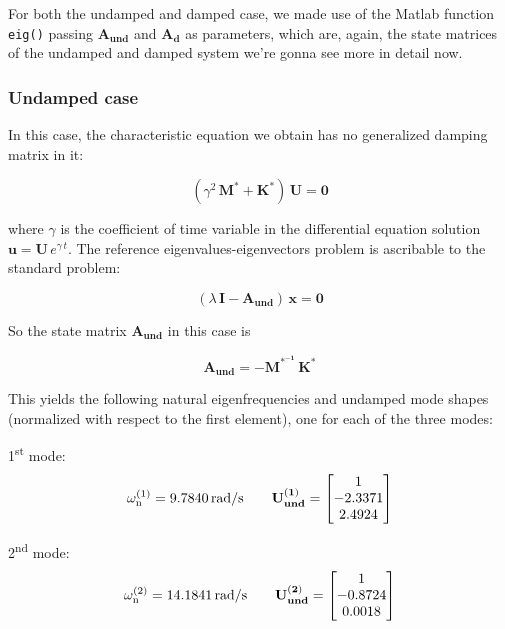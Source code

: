 \documentclass[a4paper,12pt,oneside]{article}
\begin{document}
For both the undamped and damped case, we made use of the Matlab function \lstinline!eig()! passing $ \mathbf{A_{und}} $ and $ \mathbf{A_d} $ as parameters, which are, again, the state matrices of the undamped and damped system we're gonna see more in detail now.

\subsubsection*{Undamped case}
\label{ssubs:undamped_parameters}

In this case, the characteristic equation we obtain has no generalized damping matrix in it:

\[ (\gamma^2 \, \mathbf{M^*} + \mathbf{K^*}) \, \mathbf{U} = \mathbf{0} \]

where $ \gamma $ is the coefficient of time variable in the differential equation solution $ \mathbf{u} = \mathbf{U} \, e^{\gamma \, t} $. The reference eigenvalues-eigenvectors problem is ascribable to the standard problem:

\[ (\lambda \, \mathbf{I} - \mathbf{A_{und}}) \, \mathbf{x} = \mathbf{0} \]

So the state matrix $ \mathbf{A_{und}} $ in this case is

\[ \mathbf{A_{und}} = - \mathbf{M^{*^{-1}}} \, \mathbf{K^*} \]

This yields the following natural eigenfrequencies and undamped mode shapes (normalized with respect to the first element), one for each of the three modes:

\vspace{20pt}
\begin{minipage}{0.5\textwidth}
	1\textsuperscript{st} mode:
	\[
		\omega_\textup{n}^{(1)} = 9.7840 \, \text{rad/s} \hspace{20pt}
			\mathbf{U_{und}^{(1)}} =	\begin{bmatrix}
														1 \\
														-2.3371 \\
														2.4924
													\end{bmatrix}
	\]
\end{minipage}
\begin{minipage}{0.5\textwidth}
	2\textsuperscript{nd} mode:
	\[
		\omega_\textup{n}^{(2)} = 14.1841 \, \text{rad/s} \hspace{20pt}
			\mathbf{U_{und}^{(2)}} =	\begin{bmatrix}
														1 \\
														-0.8724 \\
														0.0018
													\end{bmatrix}
	\]
\end{minipage}
\end{document}
